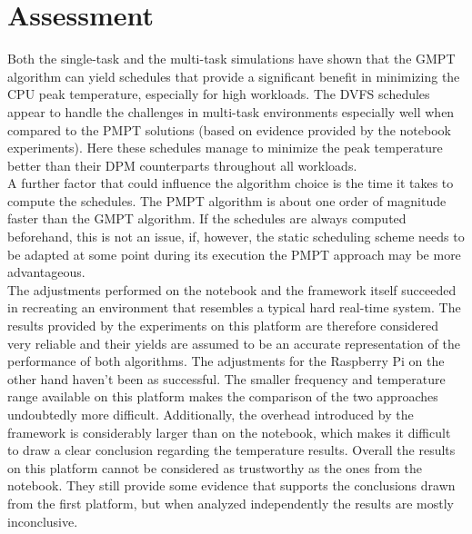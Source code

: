 \section{Assessment}
Both the single-task and the multi-task simulations have shown that the GMPT algorithm can yield schedules that provide a significant benefit in minimizing the CPU peak temperature, especially for high workloads. The DVFS schedules appear to handle the challenges in multi-task environments especially well when compared to the PMPT solutions (based on evidence provided by the notebook experiments). Here these schedules manage to minimize the peak temperature better than their DPM counterparts throughout all workloads.\\
\hspace*{0.5ex}\hspace{0.5ex} A further factor that could influence the algorithm choice is the time it takes to compute the schedules. The PMPT algorithm is about one order of magnitude faster than the GMPT algorithm. If the schedules are always computed beforehand, this is not an issue, if, however, the static scheduling scheme needs to be adapted at some point during its execution the PMPT approach may be more advantageous.\\
\hspace*{0.5ex}\hspace{0.5ex} The adjustments performed on the notebook and the framework itself succeeded in recreating an environment that resembles a typical hard real-time system. The results provided by the experiments on this platform are therefore considered very reliable and their yields are assumed to be an accurate representation of the performance of both algorithms. The adjustments for the Raspberry Pi on the other hand haven't been as successful. The smaller frequency and temperature range available on this platform makes the comparison of the two approaches undoubtedly more difficult. Additionally, the overhead introduced by the framework is considerably larger than on the notebook, which makes it difficult to draw a clear conclusion regarding the temperature results. Overall the results on this platform cannot be considered as trustworthy as the ones from the notebook. They still provide some evidence that supports the conclusions drawn from the first platform, but when analyzed independently the results are mostly inconclusive.